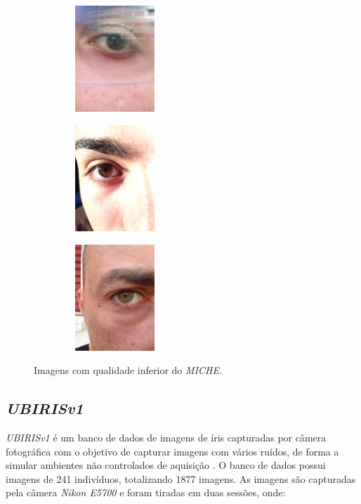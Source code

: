 \begin{figure}[h!]
\begin{subfigure}{.3\textwidth}
\centering
\includegraphics[width=4cm,height=4cm]{img/Resultados/miche/oculos.jpg}
\end{subfigure}\hfill
\begin{subfigure}{.3\textwidth}
\centering
\includegraphics[width=4cm,height=4cm]{img/Resultados/miche/ruidosa.jpg}
\end{subfigure}\hfill
\begin{subfigure}{.3\textwidth}
\centering
\includegraphics[width=4cm,height=4cm]{img/Resultados/miche/ruidosa_funda.jpg}
\end{subfigure}
\caption{Imagens com qualidade inferior do \textit{MICHE}.}
\label{fig:experimentos:miche_boas}
\end{figure}

\FloatBarrier

\subsection{\textit{UBIRISv1}}\label{sec:experimentos:db:ubirisv1}

\par \textit{UBIRISv1} é um banco de dados de imagens de íris capturadas por câmera fotográfica com o objetivo de capturar imagens com vários ruídos, de forma a simular ambientes não controlados de aquisição \cite{proenca2005-ubirisv1, ubirisv1}. O banco de dados possui imagens de 241 indivíduos, totalizando 1877 imagens. As imagens são capturadas pela câmera \textit{Nikon E5700} e foram tiradas em duas sessões, onde:

